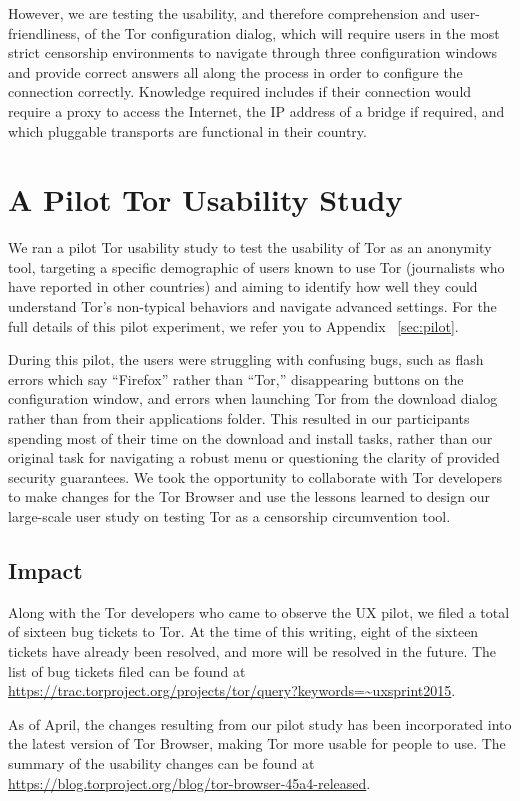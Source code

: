 \documentclass[letterpaper,twocolumn,11pt]{article}
\begin{document}
However, we are testing the usability, and therefore comprehension and user-friendliness, of the Tor configuration 
dialog, which will require users in the most strict censorship environments to navigate through three configuration windows and provide correct answers all along the process in order to configure the connection correctly. Knowledge
required includes if their connection would require a proxy to access the Internet, the IP address of a bridge if required, 
and which pluggable transports are functional in their country. 

\section{A Pilot Tor Usability Study} 
\indent \indent We ran a pilot Tor usability study to test the usability of Tor as an anonymity tool,
targeting a specific demographic of users known to use Tor (journalists who have reported in other
countries) and aiming to identify how well they could understand Tor's non-typical behaviors and 
navigate advanced settings. For the full details of this pilot experiment, we refer you to Appendix ~\ref{sec:pilot}.  

During this pilot, the users were struggling with confusing bugs, such as flash errors which
say ``Firefox'' rather than ``Tor,'' disappearing buttons on the configuration window, and errors when
launching Tor from the download dialog rather than from their applications folder. This resulted in our 
participants spending most of their time on the download and install tasks, rather than 
our original task for navigating a robust menu or questioning the clarity of provided security 
guarantees. We took the opportunity to collaborate with Tor developers to make changes for the Tor 
Browser and use the lessons learned to design our large-scale user study on testing Tor as a 
censorship circumvention tool. 

\subsection{Impact}
\indent \indent Along with the Tor developers who came to observe the UX pilot, we filed 
a total of sixteen bug tickets to Tor. At the time of  this writing, eight of the sixteen tickets 
have already been resolved, and more will be resolved in the future.  The list of bug
tickets filed can be found at \url{https://trac.torproject.org/projects/tor/query?keywords=~uxsprint2015}. 

As of April, the changes resulting from our pilot study has been incorporated into the latest 
version of Tor Browser, making Tor more usable for people to use. 
The summary of the usability changes can be found at \url{https://blog.torproject.org/blog/tor-browser-45a4-released}. 
\end{document}
